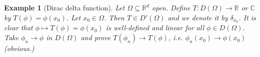 \documentclass{report}
\theoremstyle{tommy}
\newtheorem{eg}[defn]{Example}
\newcommand{\dist}{\operatorname{dist}}
\newcommand{\supp}{\operatorname{supp}}
\begin{document}
  
  \begin{eg}[Dirac delta function]
    Let \(\Omega \subseteq \mathbb{R}^d\) open. Define \(T: D(\Omega) \to \mathbb{R}\) or \(\mathbb{C}\) by \(T(\phi) = \phi(x_0)\). Let \(x_0 \in \Omega\). Then \(T \in D'(\Omega)\) and we denote it by \(\delta_{x_0}\). It is clear that \(\phi \mapsto T(\phi) = \phi(x_0)\) is well-defined and linear for all \(\phi \in D(\Omega)\). Take \(\phi_n \to \phi\) in \(D(\Omega)\) and prove \(T(\phi_n) \to T(\phi)\), i.e. \(\phi_n(x_0) \to \phi(x_0)\) (obvious.)
  \end{eg}
\end{document}
